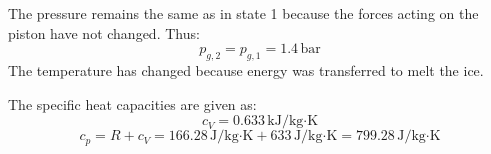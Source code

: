 The pressure remains the same as in state 1 because the forces acting on the piston have not changed. Thus:  
\[
p_{g,2} = p_{g,1} = 1.4 \, \text{bar}
\]  
The temperature has changed because energy was transferred to melt the ice.  

The specific heat capacities are given as:  
\[
c_V = 0.633 \, \text{kJ/kg·K}
\]  
\[
c_p = R + c_V = 166.28 \, \text{J/kg·K} + 633 \, \text{J/kg·K} = 799.28 \, \text{J/kg·K}
\]